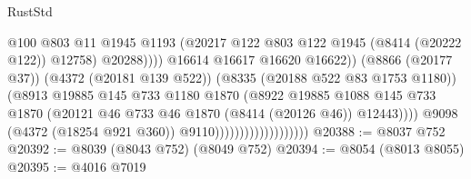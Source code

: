 \begin{lexlean}{RustStd}
\begin{coremodule}
                                                        @100
                                                        @803
                                                        @11
                                                        @1945
                                                        @1193
                                                        (@20217
                                                          @122
                                                          @803
                                                          @122
                                                          @1945
                                                          (@8414 (@20222 @122))
                                                          @12758)
                                                        @20288))))
                                                @16614
                                                @16617
                                                @16620
                                                @16622))
                                            (@8866 (@20177 @37))
                                            (@4372 (@20181 @139 @522))
                                            (@8335 (@20188 @522 @83 @1753 @1180))
                                            (@8913
                                              @19885
                                              @145
                                              @733
                                              @1180
                                              @1870
                                              (@8922
                                                @19885
                                                @1088
                                                @145
                                                @733
                                                @1870
                                                (@20121
                                                  @46
                                                  @733
                                                  @46
                                                  @1870
                                                  (@8414 (@20126 @46))
                                                  @12443))))
                                          @9098
                                          (@4372 (@18254 @921 @360))
                                          @9110)))))))))))))))))))
@20388 := @8037 @752
@20392 := @8039 (@8043 @752) (@8049 @752)
@20394 := @8054 (@8013 @8055)
@20395 := @4016 @7019

\end{coremodule}
\end{lexlean}
